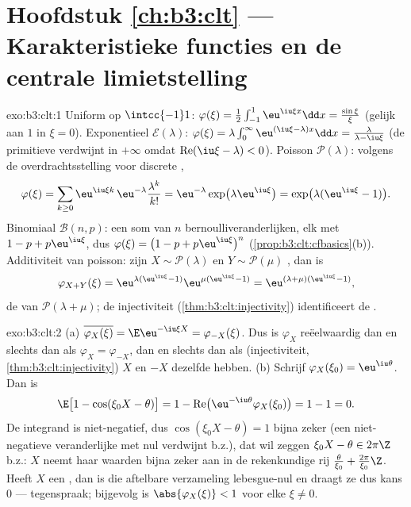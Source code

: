 \section*{Hoofdstuk \ref{ch:b3:clt} --- Karakteristieke
functies en de centrale limietstelling}

\begin{solution}{exo:b3:clt:1}
Uniform op $\intcc{-1}1$: $\varphi(\xi) =
\frac12\int_{-1}^1\eu^{\iu\xi x}\dd x =
\frac{\sin\xi}{\xi}$ (gelijk aan $1$ in $\xi = 0$).
Exponentieel $\mathcal E(\lambda)$: $\varphi(\xi) =
\lambda\int_0^\infty\eu^{(\iu\xi - \lambda)x}\dd x =
\frac{\lambda}{\lambda - \iu\xi}$ (de primitieve verdwijnt
in $+\infty$ omdat $\operatorname{Re}(\iu\xi -
\lambda) < 0$). Poisson $\mathcal P(\lambda)$: volgens de
overdrachtsstelling voor discrete ,
\[
\varphi(\xi) = \sum_{k\geq0}\eu^{\iu\xi
k}\,\eu^{-\lambda}\frac{\lambda^k}{k!}
= \eu^{-\lambda}\exp\bigl(\lambda\eu^{\iu\xi}\bigr)
= \exp\bigl(\lambda(\eu^{\iu\xi} - 1)\bigr).
\]
Binomiaal $\mathcal B(n, p)$: een som van $n$ 
bernoulliveranderlijken, elk met  $1
- p + p\eu^{\iu\xi}$, dus $\varphi(\xi) = \bigl(1 - p +
p\eu^{\iu\xi}\bigr)^n$ (\cref{prop:b3:clt:cfbasics}(b)).
Additiviteit van poisson: zijn $X \sim \mathcal P(\lambda)$
en $Y \sim \mathcal P(\mu)$ , dan is
\[
\varphi_{X+Y}(\xi) = \eu^{\lambda(\eu^{\iu\xi}-1)}
\eu^{\mu(\eu^{\iu\xi}-1)} =
\eu^{(\lambda+\mu)(\eu^{\iu\xi}-1)},
\]
de  van $\mathcal P(\lambda + \mu)$;
de injectiviteit (\cref{thm:b3:clt:injectivity})
identificeert de .
\end{solution}

\begin{solution}{exo:b3:clt:2}
(a) $\overline{\varphi_X(\xi)} = \E\eu^{-\iu\xi X} =
\varphi_{-X}(\xi)$. Dus is $\varphi_X$ reëelwaardig dan en
slechts dan als $\varphi_X = \varphi_{-X}$, dan en slechts
dan als (injectiviteit,
\cref{thm:b3:clt:injectivity}) $X$ en $-X$ dezelfde
 hebben.
(b) Schrijf $\varphi_X(\xi_0) = \eu^{\iu\theta}$. Dan is
\[
\E\bigl[1 - \cos(\xi_0X - \theta)\bigr]
= 1 - \operatorname{Re}\bigl(\eu^{-\iu\theta}
\varphi_X(\xi_0)\bigr) = 1 - 1 = 0 .
\]
De integrand is niet-negatief, dus $\cos(\xi_0X - \theta) =
1$ bijna zeker (een niet-negatieve veranderlijke met
 nul verdwijnt b.z.), dat wil zeggen
$\xi_0X - \theta \in 2\pi\Z$ b.z.: $X$ neemt haar waarden
bijna zeker aan in de rekenkundige rij
$\frac{\theta}{\xi_0} + \frac{2\pi}{\xi_0}\Z$. Heeft $X$
een , dan is die aftelbare verzameling
lebesgue-nul en draagt ze dus kans $0$ --- tegenspraak;
bijgevolg is $\abs{\varphi_X(\xi)} < 1$ voor elke $\xi \neq
0$.
\end{solution}

